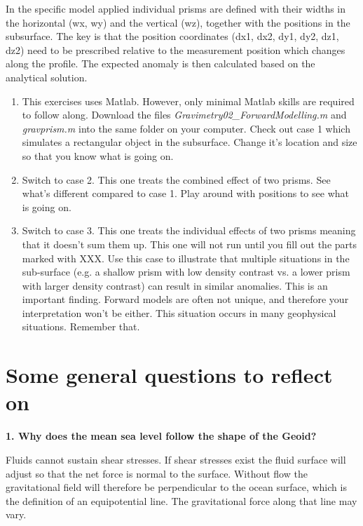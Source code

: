 \documentclass[a4paper,12pt]{article}
\newif\ifanswers
\begin{document}
In the specific model applied individual prisms are defined with their widths in the horizontal (wx, wy) and the vertical (wz), together with the positions in the subsurface. The key is that the position coordinates (dx1, dx2, dy1, dy2, dz1, dz2) need to be prescribed relative to the measurement position which changes along the profile. The expected anomaly is then calculated based on the analytical solution.
\begin{enumerate}[label=(\alph*)]

  \item This exercises uses Matlab. However, only minimal Matlab skills are required to follow along. Download the files \textit{Gravimetry02\_ForwardModelling.m} and \textit{gravprism.m} into the same folder on your computer. Check out case 1 which simulates a rectangular object in the subsurface. Change it's location and size so that you know what is going on.

  \item Switch to case 2. This one treats the combined effect of two prisms. See what's different compared to case 1. Play around with positions to see what is going on.

  \item Switch to case 3. This one treats the individual effects of two prisms meaning that it doesn't sum them up. This one will not run until you fill out the parts marked with XXX. Use this case to illustrate that multiple situations in the sub-surface (e.g. a shallow prism with low density contrast vs. a lower prism with larger density contrast) can result in similar anomalies. This is an important finding. Forward models are often not unique, and therefore your interpretation won't be either. This situation occurs in many geophysical situations. Remember that.
\end{enumerate}
\begin{tcolorbox}[enhanced jigsaw,breakable,pad at break*=1mm,
  colback=blue!5!white,colframe=babyblueeyes,title=Solutions,
  watermark color=white]
  
\end{tcolorbox}


\section{Some general questions to reflect on}

\textbf{1. Why does the mean sea level follow the shape of the Geoid?}
\ifanswers
  \begin{tcolorbox}[enhanced jigsaw,breakable,pad at break*=1mm,
    colback=blue!5!white,colframe=babyblueeyes,title=Solutions]
  Fluids cannot sustain shear stresses. If shear stresses exist the fluid surface will adjust so that the net force is normal to the surface. Without flow the gravitational field will therefore be perpendicular to the ocean surface, which is the definition of an equipotential line. The gravitational force along that line may vary.
  \end{tcolorbox}
\end{document}
